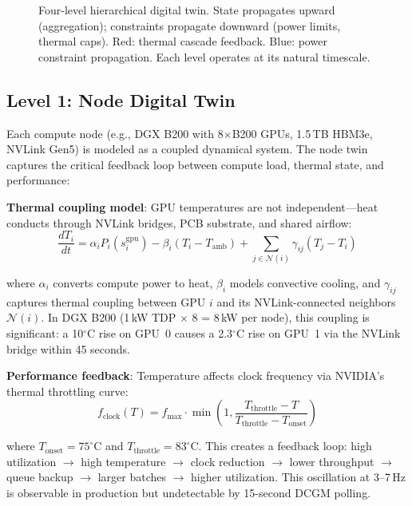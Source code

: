 \documentclass[conference,10pt]{IEEEtran}
\begin{document}
\begin{figure}[!htbp]
\caption{Four-level hierarchical digital twin. State propagates upward (aggregation); constraints propagate downward (power limits, thermal caps). Red: thermal cascade feedback. Blue: power constraint propagation. Each level operates at its natural timescale.}
\label{fig:twin}
\end{figure}

\subsection{Level 1: Node Digital Twin}

Each compute node (e.g., DGX B200 with 8$\times$B200 GPUs, 1.5\,TB HBM3e, NVLink Gen5) is modeled as a coupled dynamical system. The node twin captures the critical feedback loop between compute load, thermal state, and performance:

\textbf{Thermal coupling model}: GPU temperatures are not independent---heat conducts through NVLink bridges, PCB substrate, and shared airflow:
\begin{equation}
\frac{dT_i}{dt} = \alpha_i P_i(s_i^{\text{gpu}}) - \beta_i(T_i - T_{\text{amb}}) + \sum_{j \in \mathcal{N}(i)} \gamma_{ij}(T_j - T_i)
\end{equation}

where $\alpha_i$ converts compute power to heat, $\beta_i$ models convective cooling, and $\gamma_{ij}$ captures thermal coupling between GPU $i$ and its NVLink-connected neighbors $\mathcal{N}(i)$. In DGX B200 (1\,kW TDP $\times$ 8 = 8\,kW per node), this coupling is significant: a 10$^\circ$C rise on GPU~0 causes a 2.3$^\circ$C rise on GPU~1 via the NVLink bridge within 45 seconds.

\textbf{Performance feedback}: Temperature affects clock frequency via NVIDIA's thermal throttling curve:
\begin{equation}
f_{\text{clock}}(T) = f_{\text{max}} \cdot \min\left(1, \frac{T_{\text{throttle}} - T}{T_{\text{throttle}} - T_{\text{onset}}}\right)
\end{equation}

where $T_{\text{onset}} = 75^\circ$C and $T_{\text{throttle}} = 83^\circ$C. This creates a feedback loop: high utilization $\to$ high temperature $\to$ clock reduction $\to$ lower throughput $\to$ queue backup $\to$ larger batches $\to$ higher utilization. This oscillation at 3--7\,Hz is observable in production but undetectable by 15-second DCGM polling.
\end{document}
